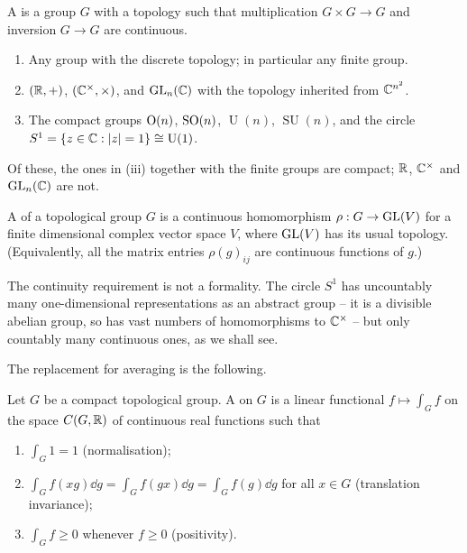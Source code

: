\documentclass[a4paper]{scrartcl}
\newcommand{\U}{\operatorname{U}}
\newcommand{\SU}{\operatorname{SU}}
\begin{document}
\begin{definition}
	A  is a group $G$ with a topology such that multiplication $G\times G\to G$ and inversion $G\to G$ are continuous.
\end{definition}

\begin{example}
	\begin{enumerate}[label=(\roman*)]
		\item Any group with the discrete topology; in particular any finite group.
		\item $(\mathbb{R},+)$, $(\mathbb{C}^\times,\times)$, and $\operatorname{GL}_n(\mathbb{C})$ with the topology inherited from $\mathbb{C}^{n^2}$.
		\item The compact groups $\operatorname{O}(n)$, $\operatorname{SO}(n)$, $\U(n)$, $\SU(n)$, and the circle $S^1 = \{z\in\C : |z| = 1\} \cong \U(1)$.
	\end{enumerate}
	Of these, the ones in (iii) together with the finite groups are compact; $\mathbb{R}$, $\mathbb{C}^\times$ and $\operatorname{GL}_n(\mathbb{C})$ are not.
\end{example}

\begin{definition}
	A  of a topological group $G$ is a continuous homomorphism $\rho : G \to \operatorname{GL}(V)$ for a finite dimensional complex vector space $V$, where $\operatorname{GL}(V)$ has its usual topology. (Equivalently, all the matrix entries $\rho(g)_{ij}$ are continuous functions of $g$.)
\end{definition}

The continuity requirement is not a formality. The circle $S^1$ has uncountably many one-dimensional representations as an abstract group -- it is a divisible abelian group, so has vast numbers of homomorphisms to $\mathbb{C}^\times$ -- but only countably many continuous ones, as we shall see.

The replacement for averaging is the following.

\begin{definition}
	Let $G$ be a compact topological group. A  on $G$ is a linear functional $f\mapsto\int_Gf$ on the space $C(G,\mathbb{R})$ of continuous real functions such that
	\begin{enumerate}[label=(\roman*)]
		\item $\int_G 1 = 1$ (normalisation);
		\item $\int_G f(xg)\dd g = \int_G f(gx)\dd g = \int_G f(g)\dd g$ for all $x\in G$ (translation invariance);
		\item $\int_G f \geq 0$ whenever $f\geq0$ (positivity).
	\end{enumerate}
\end{definition}
\end{document}
